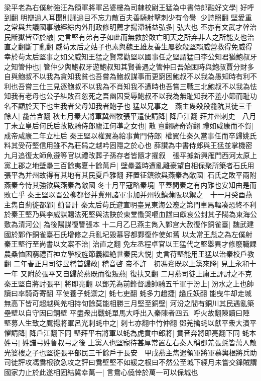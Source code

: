 梁平老為右僕射強汪為領軍將軍呂婆樓為司隸校尉王猛為中書侍郎融好文學|{
	好呼到翻}
明辯過人耳聞則誦過目不忘力敵百夫善騎射擊刺少有令譽|{
	少詩照翻}
堅愛重之常與共議國事融經綜内外刑政修明薦才揚滯補益弘多|{
	弘大也}
丕亦有文武才幹治民斷獄皆亞於融|{
	史言堅有弟有子如此而無救於敗亡明天之所弃非人之所能支也治直之翻斷丁亂翻}
威苟太后之姑子也素與魏王雄友善生屢欲殺堅賴威營救得免威得幸於苟太后堅事之如父威知王猛之賢常勸堅以國事任之堅謂猛曰李公知君猶鮑叔牙之知管仲也|{
	管仲少與鮑叔牙遊鮑叔知其賢善遇之管仲曰吾始困時與鮑叔賈分財多自與鮑叔不以我為貪知我貧也吾嘗為鮑叔謀事而更窮困鮑叔不以我為愚知時有利不利也吾嘗三仕三見逐鮑叔不以我為不肖知我不遭時也吾嘗三戰三北鮑叔不以我為怯知我有老母也公子糾敗召忽死之吾幽囚受辱鮑叔不以我為無耻知我不羞小節而耻功名不顯於天下也生我者父母知我者鮑子也}
猛以兄事之　燕主雋殺段龕阬其徒三千餘人|{
	龕苦含翻}
秋七月秦大將軍冀州牧張平遣使請降|{
	降戶江翻}
拜并州刺史　八月丁未立皇后何氏后故散騎侍郎廬江何凖之女也|{
	散亶翻騎奇寄翻}
禮如咸康而不賀|{
	成帝咸康二年立杜后}
秦王堅以權翼為給事黄門侍郎|{
	權翼仕秦久當事任而卒歸姚氏料其受苻堅信用雖不為莊舄之越吟固隱之於心也}
薛讃為中書侍郎與王猛並掌機密九月追復太師魚遵等官以禮改葬子孫存者皆隨才擢叙　張平據新興雁門西河太原上黨上郡之地壁壘三百餘夷夏十餘萬戶|{
	壁壘蓋時遭亂離豪望自相保聚所築者石氏用張平為并州故得有其地有其民夏戶雅翻}
拜置征鎮欲與燕秦為敵國|{
	石氏之敗平兩附燕秦今恃其強欲與燕秦為敵國}
冬十月平寇略秦境|{
	平蓋間秦之有内難也安知由是而敗亡乎}
秦王堅以晋公柳都督并冀州諸軍事加并州牧鎮蒲阪以禦之　十一月癸酉燕主雋自薊徙都鄴|{
	薊音計}
秦太后苟氏遊宣明臺見東海公灋之第門車馬輻凑恐終不利於秦王堅乃與李威謀賜法死堅與法訣於東堂慟哭嘔血諡曰獻哀公封其子陽為東海公敷為清河公|{
	為後陽謀復讐張本}
十二月乙巳燕主雋入鄴宫大赦復作銅雀臺|{
	魏武建國於鄴作銅雀臺石氏增修之兵亂圮毁慕容都鄴復作使如舊}
以太常王彪之為左僕射　秦王堅行至尚書以文案不治|{
	治直之翻}
免左丞程卓官以王猛代之堅舉異才修廢職課農桑恤困窮禮百神立學校旌節義繼絶世秦民大悦|{
	史言苻堅能用王猛以治秦校戶教翻}
二年春正月司徒昱稽首歸政|{
	稽音啓}
帝不許　初馮鴦既以上黨來降|{
	見上永和十一年}
又附於張平又自歸於燕既而復叛燕|{
	復扶又翻}
二月燕司徒上庸王評討之不克　秦王堅自將討張平|{
	將即亮翻}
以鄧羌為前鋒督護帥騎五千軍于汾上|{
	汾水之上也帥讀曰率騎奇寄翻}
平使養子蚝禦之|{
	蚝七吏翻}
蚝多力趫捷|{
	趫丘妖翻}
能曳牛却走城無高下皆可超越與羌相持旬餘莫能相勝三月堅至銅壁|{
	河汾之間有銅川其民遇亂築壘壁以自守因曰銅壁}
平盡衆出戰蚝單馬大呼出入秦陳者四五|{
	呼火故翻陳讀曰陣}
堅募人生致之鷹揚將軍呂光刺蚝中之|{
	刺七亦翻中竹仲翻}
鄧羌擒蚝以獻平衆大潰平懼請降|{
	降戶江翻下同}
堅拜平右將軍以蚝為虎賁中郎將|{
	賁音奔將即亮翻下同}
蚝本姓弓|{
	姓譜弓姓魯叔弓之後}
上黨人也堅寵待甚厚常置左右秦人稱鄧羌張蚝皆萬人敵光婆樓之子也堅徙張平部民三千餘戶于長安　甲戌燕主雋遣領軍將軍慕輿根將兵助司徒評攻馮鴦根欲急攻之評曰鴦壁堅不如緩之根曰不然公至城下經月未嘗交鋒賊謂國家力止於此遂相固結冀幸萬一|{
	言鴦心僥倖於萬一可以保城也}
